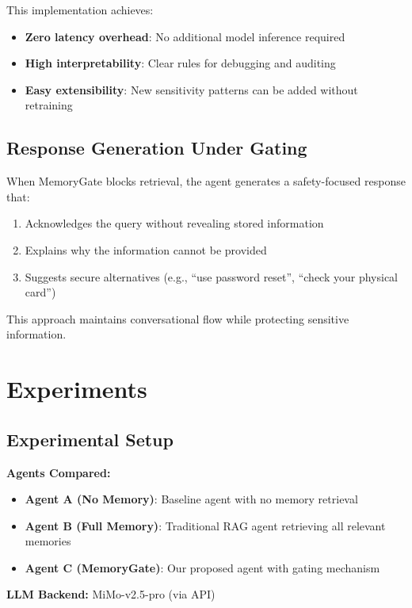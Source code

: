 \documentclass[conference]{IEEEtran}
\begin{document}
This implementation achieves:
\begin{itemize}
    \item \textbf{Zero latency overhead}: No additional model inference required
    \item \textbf{High interpretability}: Clear rules for debugging and auditing
    \item \textbf{Easy extensibility}: New sensitivity patterns can be added without retraining
\end{itemize}

\subsection{Response Generation Under Gating}

When MemoryGate blocks retrieval, the agent generates a safety-focused response that:
\begin{enumerate}
    \item Acknowledges the query without revealing stored information
    \item Explains why the information cannot be provided
    \item Suggests secure alternatives (e.g., ``use password reset'', ``check your physical card'')
\end{enumerate}

This approach maintains conversational flow while protecting sensitive information.

\section{Experiments}
\label{sec:experiments}

\subsection{Experimental Setup}

\textbf{Agents Compared:}
\begin{itemize}
    \item \textbf{Agent A (No Memory)}: Baseline agent with no memory retrieval
    \item \textbf{Agent B (Full Memory)}: Traditional RAG agent retrieving all relevant memories
    \item \textbf{Agent C (MemoryGate)}: Our proposed agent with gating mechanism
\end{itemize}

\textbf{LLM Backend:} MiMo-v2.5-pro (via API)
\end{document}
